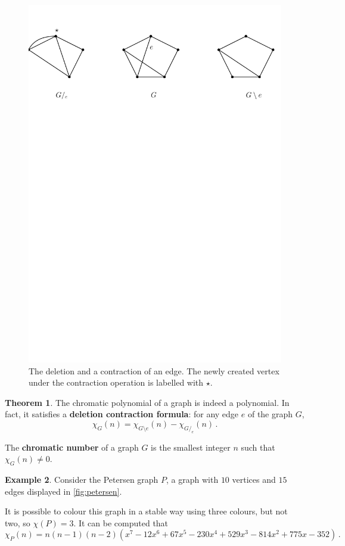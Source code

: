 \documentclass[12pt]{amsart}
\theoremstyle{definition}
\newtheorem{thm}{Theorem}[section]
\newtheorem{smpl}[thm]{Example}
\begin{document}
\begin{figure}
\includegraphics[scale=.61]{../imgs/del_cont}
\caption{The deletion and a contraction of an edge\label{fig:contraction}. The newly created vertex under the contraction operation is labelled with $\star$.}
\end{figure}

\begin{thm}
The chromatic polynomial of a graph is indeed a polynomial.
In fact, it satisfies a \textbf{deletion contraction formula}: for any edge $e$ of the graph $G$, 
$$\chi_G(n) = \chi_{G\setminus e}(n) - \chi_{G/_e}(n)\, .$$
\end{thm}

The \textbf{chromatic number} of a graph $G$ is the smallest integer $n$ such that $\chi_G(n) \neq 0$.

\begin{smpl}
Consider the Petersen graph $P$, a graph with $10$ vertices and $15$ edges displayed in \cref{fig:petersen}.

It is possible to colour this graph in a stable way using three colours, but not two, so $\chi(P) = 3$.
It can be computed that 
$$\chi_P(n) = n ( n-1) (n-2) (x^7 -12 x^6+67 x^5 - 230 x^4 + 529 x^3 - 814 x^2 + 775 x - 352 ) \, . $$
\end{smpl}
\end{document}
